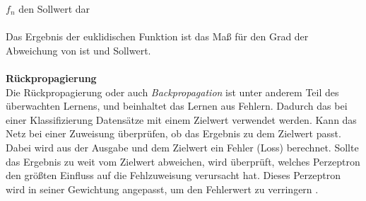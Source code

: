 	$f_{n}$ den Sollwert dar\\\\
Das Ergebnis der euklidischen Funktion ist das Maß für den Grad der Abweichung von ist und Sollwert.\\\\
\textbf{Rückpropagierung}\\
Die Rückpropagierung oder auch \textit{Backpropagation} \cite{ertel2013grundkurs} ist unter anderem Teil des überwachten Lernens, und beinhaltet das Lernen aus Fehlern. Dadurch das bei einer Klassifizierung Datensätze mit einem Zielwert verwendet werden. Kann das Netz bei einer Zuweisung überprüfen, ob das Ergebnis zu dem Zielwert passt. Dabei wird aus der Ausgabe und dem Zielwert ein Fehler (Loss) berechnet. Sollte das Ergebnis zu weit vom Zielwert abweichen, wird überprüft, welches Perzeptron den größten Einfluss auf die Fehlzuweisung verursacht hat. Dieses Perzeptron wird in seiner Gewichtung angepasst, um den Fehlerwert zu verringern \cite{goodfellow2016deep}.  
